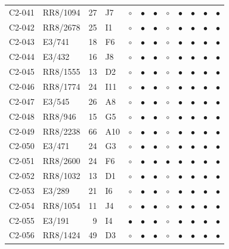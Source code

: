 {\begin{longtable}{llrp{3.9cm}cccccccc}
    C2-041 & RR8/1094 & 27 & J7 & $\circ$ & $\bullet$ & $\bullet$ & $\circ$ & $\bullet$ & $\bullet$ & $\bullet$ & $\bullet$ \\
    C2-042 & RR8/2678 & 25 & I1 & $\circ$ & $\bullet$ & $\bullet$ & $\circ$ & $\bullet$ & $\bullet$ & $\bullet$ & $\bullet$ \\
    C2-043 & E3/741 & 18 & F6 & $\circ$ & $\bullet$ & $\bullet$ & $\circ$ & $\bullet$ & $\bullet$ & $\bullet$ & $\bullet$ \\
    C2-044 & E3/432 & 16 & J8 & $\circ$ & $\bullet$ & $\bullet$ & $\circ$ & $\bullet$ & $\bullet$ & $\bullet$ & $\bullet$ \\
    C2-045 & RR8/1555 & 13 & D2 & $\circ$ & $\bullet$ & $\bullet$ & $\circ$ & $\bullet$ & $\bullet$ & $\bullet$ & $\bullet$ \\
    C2-046 & RR8/1774 & 24 & I11 & $\circ$ & $\bullet$ & $\bullet$ & $\circ$ & $\bullet$ & $\bullet$ & $\bullet$ & $\bullet$ \\
    C2-047 & E3/545 & 26 & A8 & $\circ$ & $\bullet$ & $\bullet$ & $\circ$ & $\bullet$ & $\bullet$ & $\bullet$ & $\bullet$ \\
    C2-048 & RR8/946 & 15 & G5 & $\circ$ & $\bullet$ & $\bullet$ & $\circ$ & $\bullet$ & $\bullet$ & $\bullet$ & $\bullet$ \\
    C2-049 & RR8/2238 & 66 & A10 & $\circ$ & $\bullet$ & $\bullet$ & $\circ$ & $\bullet$ & $\bullet$ & $\bullet$ & $\bullet$ \\
    C2-050 & E3/471 & 24 & G3 & $\circ$ & $\bullet$ & $\bullet$ & $\circ$ & $\bullet$ & $\bullet$ & $\bullet$ & $\bullet$ \\
    C2-051 & RR8/2600 & 24 & F6 & $\circ$ & $\bullet$ & $\bullet$ & $\bullet$ & $\bullet$ & $\bullet$ & $\bullet$ & $\bullet$ \\
    C2-052 & RR8/1032 & 13 & D1 & $\circ$ & $\bullet$ & $\bullet$ & $\circ$ & $\bullet$ & $\bullet$ & $\bullet$ & $\bullet$ \\
    C2-053 & E3/289 & 21 & I6 & $\circ$ & $\bullet$ & $\bullet$ & $\circ$ & $\bullet$ & $\bullet$ & $\bullet$ & $\bullet$ \\
    C2-054 & RR8/1054 & 11 & J4 & $\circ$ & $\bullet$ & $\bullet$ & $\circ$ & $\bullet$ & $\bullet$ & $\bullet$ & $\bullet$ \\
    C2-055 & E3/191 & 9 & I4 & $\bullet$ & $\bullet$ & $\bullet$ & $\circ$ & $\bullet$ & $\bullet$ & $\bullet$ & $\bullet$ \\
    C2-056 & RR8/1424 & 49 & D3 & $\circ$ & $\bullet$ & $\bullet$ & $\circ$ & $\bullet$ & $\bullet$ & $\bullet$ & $\bullet$ \\

\end{longtable}}
